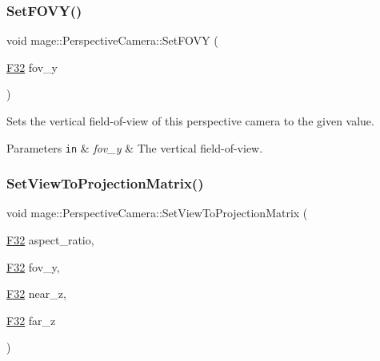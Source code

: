 \subsubsection{\texorpdfstring{Set\+F\+O\+V\+Y()}{SetFOVY()}}
{\footnotesize\ttfamily void mage\+::\+Perspective\+Camera\+::\+Set\+F\+O\+VY (\begin{DoxyParamCaption}\item[{\hyperlink{namespacemage_aa97e833b45f06d60a0a9c4fc22ae02c0}{F32}}]{fov\+\_\+y }\end{DoxyParamCaption})\hspace{0.3cm}{\ttfamily [noexcept]}}

Sets the vertical field-\/of-\/view of this perspective camera to the given value.


\begin{DoxyParams}[1]{Parameters}
\mbox{\tt in}  & {\em fov\+\_\+y} & The vertical field-\/of-\/view. \\
\hline
\end{DoxyParams}
\hypertarget{classmage_1_1_perspective_camera_a988390ca5bac4f3fcfb66aa7fc7effc8}{}\label{classmage_1_1_perspective_camera_a988390ca5bac4f3fcfb66aa7fc7effc8} 
\subsubsection{\texorpdfstring{Set\+View\+To\+Projection\+Matrix()}{SetViewToProjectionMatrix()}\hspace{0.1cm}{\footnotesize\ttfamily [1/2]}}
{\footnotesize\ttfamily void mage\+::\+Perspective\+Camera\+::\+Set\+View\+To\+Projection\+Matrix (\begin{DoxyParamCaption}\item[{\hyperlink{namespacemage_aa97e833b45f06d60a0a9c4fc22ae02c0}{F32}}]{aspect\+\_\+ratio,  }\item[{\hyperlink{namespacemage_aa97e833b45f06d60a0a9c4fc22ae02c0}{F32}}]{fov\+\_\+y,  }\item[{\hyperlink{namespacemage_aa97e833b45f06d60a0a9c4fc22ae02c0}{F32}}]{near\+\_\+z,  }\item[{\hyperlink{namespacemage_aa97e833b45f06d60a0a9c4fc22ae02c0}{F32}}]{far\+\_\+z }\end{DoxyParamCaption})\hspace{0.3cm}{\ttfamily [noexcept]}}

